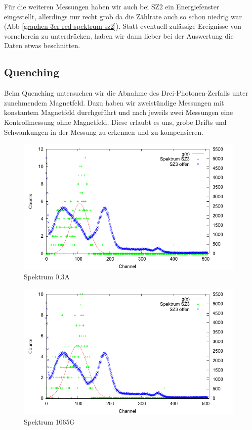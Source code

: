Für die weiteren Messungen haben wir auch bei SZ2 ein Energiefenster eingestellt, allerdings nur recht grob da die Zählrate auch so schon niedrig war (Abb \ref{graphen-3er-red-spektrum-sz2}). Statt eventuell zulässige Ereignisse von vorneherein zu unterdrücken, haben wir dann lieber bei der Auswertung die Daten etwas beschnitten.

\subsection{Quenching}

Beim Quenching untersuchen wir die Abnahme des Drei-Photonen-Zerfalls unter zunehmendem Magnetfeld. Dazu haben wir zweistündige Messungen mit konstantem Magnetfeld durchgeführt und nach jeweils zwei Messungen eine Kontrollmessung ohne Magnetfeld. Diese erlaubt es uns, grobe Drifts und Schwankungen in der Messung zu erkennen und zu kompensieren.

\begin{figure}
 \includegraphics[width=\textwidth]{Graphen/quench/spektrum_0-3.pdf}
 \caption{Spektrum 0,3A}
\end{figure}

\begin{figure}
 \includegraphics[width=\textwidth]{Graphen/quench/spektrum_1065.pdf}
 \caption{Spektrum 1065G}
\end{figure}


